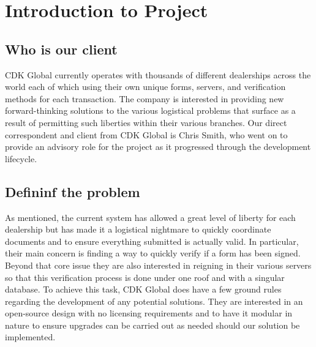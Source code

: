 \documentclass[article, onecolumn, draftclsnofoot,10pt, compsoc]{IEEEtran}
\begin{document}
\section{Introduction to Project}
\subsection{Who is our client}
CDK Global currently operates with thousands of different dealerships across the world each of which using their own unique forms, servers, and veriﬁcation methods for each transaction. The company is interested in providing new forward-thinking solutions to the various logistical problems that surface as a result of permitting such liberties within their various branches. Our direct correspondent and client from CDK Global is Chris Smith, who went on to provide an advisory role for the project as it progressed through the development lifecycle.

\subsection{Defininf the problem}
As mentioned, the current system has allowed a great level of liberty for each dealership but has made it a logistical nightmare to quickly coordinate documents and to ensure everything submitted is actually valid. In particular, their main concern is ﬁnding a way to quickly verify if a form has been signed. Beyond that core issue they are also interested in reigning in their various servers so that this veriﬁcation process is done under one roof and with a singular database. To achieve this task, CDK Global does have a few ground rules regarding the development of any potential solutions. They are interested in an open-source design with no licensing requirements and to have it modular in nature to ensure upgrades can be carried out as needed should our solution be implemented.
\end{document}
